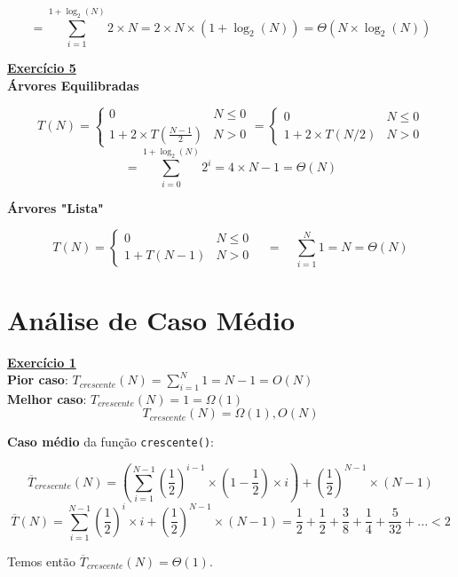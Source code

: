 \documentclass[a4paper,11pt]{article}
\begin{document}
	\[
		= \sum_{i=1}^{1 + \log_2(N)} 2 \times N = 2 \times N \times (1 + \log_2(N)) = \Theta(N \times \log_2(N))
	\]
	
	\noindent \underline{\textbf{Exercício 5}}\\
	
	\noindent \textbf{Árvores Equilibradas}
	
	\[
		T(N) = 
		\begin{cases}
			0 & N \leq 0 \\
			1 + 2 \times T(\frac{N-1}{2}) & N > 0
		\end{cases}
		=
		\begin{cases}
			0 & N \leq 0 \\
			1 + 2 \times T(N/2) & N > 0
		\end{cases}
	\]
	\[
		= \sum_{i=0}^{1 + \log_2(N)} 2^i = 4 \times N - 1 = \Theta(N)
	\]
	
	\noindent \textbf{Árvores "Lista"}
	
	\[
	T(N) = 
	\begin{cases}
		0 & N \leq 0 \\
		1 + T(N - 1) & N > 0
	\end{cases}
	\quad = \quad \sum_{i=1}^{N} 1 = N = \Theta(N)
	\]
	
	
	
	\section{Análise de Caso Médio}
	
	
	\noindent \underline{\textbf{Exercício 1}}\\
	
	\noindent \textbf{Pior caso}: $ T_{crescente}(N) = \sum_{i=1}^{N} 1 = N - 1 = O(N) $\\
	
	\noindent \textbf{Melhor caso}: $ T_{crescente}(N) = 1 = \Omega(1) $\\
	\[
		T_{crescente}(N) = \Omega(1), O(N)
	\]
	
	\noindent \textbf{Caso médio} da função \texttt{crescente()}:
	
	\[
		\overline{T}_{crescente}(N) = (\sum_{i=1}^{N-1} (\frac{1}{2})^{i-1} \times (1-\frac{1}{2}) \times i) + (\frac{1}{2})^{N-1} \times (N - 1)
	\]
	\[
		\overline{T}(N) = \sum_{i=1}^{N-1} (\frac{1}{2})^i \times i + (\frac{1}{2})^{N-1} \times (N - 1) = \frac{1}{2} + \frac{1}{2} + \frac{3}{8} + \frac{1}{4} + \frac{5}{32} + ... < 2
	\]
	
	\noindent Temos então $ \overline{T}_{crescente}(N) = \Theta(1) $.\\
	
\end{document}
